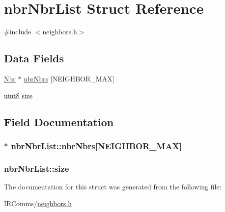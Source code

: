 \hypertarget{structnbr_nbr_list}{
\section{nbrNbrList Struct Reference}
\label{structnbr_nbr_list}
}


{\ttfamily \#include $<$neighbors.h$>$}

\subsection*{Data Fields}
\begin{DoxyCompactItemize}
\item 
\hyperlink{structnbr}{Nbr} $\ast$ \hyperlink{structnbr_nbr_list_ad5b5fc745463d5302d5139d25099b2c4}{nbrNbrs} \mbox{[}NEIGHBOR\_\-MAX\mbox{]}
\item 
\hyperlink{typedefs_8h_adde6aaee8457bee49c2a92621fe22b79}{uint8} \hyperlink{structnbr_nbr_list_a4747acaf834e558bdd5c6598b575bcd5}{size}
\end{DoxyCompactItemize}


\subsection{Field Documentation}
\hypertarget{structnbr_nbr_list_ad5b5fc745463d5302d5139d25099b2c4}{
\subsubsection[{nbrNbrs}]{$\ast$ {\bf nbrNbrList::nbrNbrs}\mbox{[}NEIGHBOR\_\-MAX\mbox{]}}}
\label{structnbr_nbr_list_ad5b5fc745463d5302d5139d25099b2c4}
\hypertarget{structnbr_nbr_list_a4747acaf834e558bdd5c6598b575bcd5}{
\subsubsection[{size}]{ {\bf nbrNbrList::size}}}
\label{structnbr_nbr_list_a4747acaf834e558bdd5c6598b575bcd5}


The documentation for this struct was generated from the following file:\begin{DoxyCompactItemize}
\item 
IRComms/\hyperlink{neighbors_8h}{neighbors.h}\end{DoxyCompactItemize}
